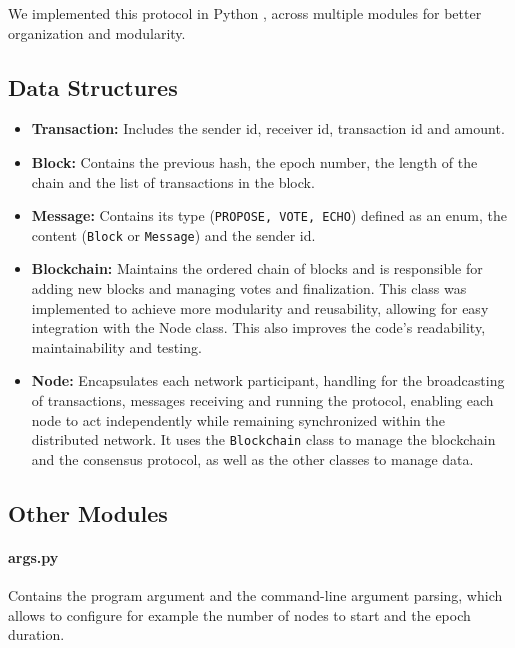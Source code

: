 We implemented this protocol in Python \cite{python}, across multiple modules for better organization and modularity. 

\subsection*{Data Structures}

\begin{itemize}
    \item \textbf{Transaction:} Includes the sender id, receiver id, transaction id and amount. 
    
    \item \textbf{Block:} Contains the previous hash, the epoch number, the length of the chain and the list of transactions in the block.
    
    \item \textbf{Message:} Contains its type (\texttt{PROPOSE, VOTE, ECHO}) defined as an enum, the content (\texttt{Block} or \texttt{Message}) and the sender id.
    
    \item \textbf{Blockchain:} Maintains the ordered chain of blocks and is responsible for adding new blocks and managing votes and finalization. This class was implemented to achieve more modularity and reusability, allowing for easy integration with the Node class. This also improves the code's readability, maintainability and testing.

    \item \textbf{Node:} Encapsulates each network participant, handling for the broadcasting of transactions, messages receiving and running the protocol, enabling each node to act independently while remaining synchronized within the distributed network. It uses the \texttt{Blockchain} class to manage the blockchain and the consensus protocol, as well as the other classes to manage data.
\end{itemize}

\subsection*{Other Modules}

\paragraph{args.py}
Contains the program argument and the command-line argument parsing, which allows to configure for example the number of nodes to start and the epoch duration.

